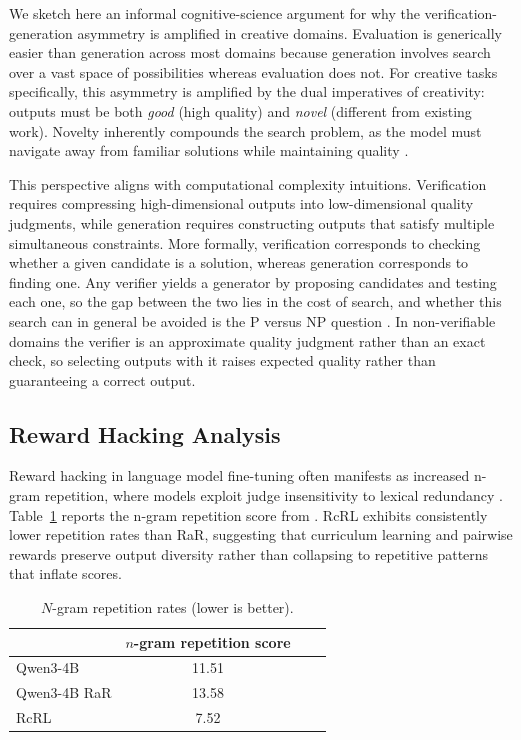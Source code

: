 \documentclass{article}
\theoremstyle{plain}
\theoremstyle{definition}
\theoremstyle{remark}
\begin{document}
We sketch here an informal cognitive-science argument for why the verification-generation asymmetry is amplified in creative domains. Evaluation is generically easier than generation across most domains because generation involves search over a vast space of possibilities whereas evaluation does not. For creative tasks specifically, this asymmetry is amplified by the dual imperatives of creativity: outputs must be both \emph{good} (high quality) and \emph{novel} (different from existing work). Novelty inherently compounds the search problem, as the model must navigate away from familiar solutions while maintaining quality \citep{newell1962processes, anderson1972recognition}.

This perspective aligns with computational complexity intuitions. Verification requires compressing high-dimensional outputs into low-dimensional quality judgments, while generation requires constructing outputs that satisfy multiple simultaneous constraints. More formally, verification corresponds to checking whether a given candidate is a solution, whereas generation corresponds to finding one. Any verifier yields a generator by proposing candidates and testing each one, so the gap between the two lies in the cost of search, and whether this search can in general be avoided is the P versus NP question \citep{cook2023complexity}. In non-verifiable domains the verifier is an approximate quality judgment rather than an exact check, so selecting outputs with it raises expected quality rather than guaranteeing a correct output. 



\subsection{Reward Hacking Analysis}
\label{app:repetition}
\label{app:failure-analysis}
Reward hacking in language model fine-tuning often manifests as increased n-gram repetition, where models exploit judge insensitivity to lexical redundancy \citep{holtzman2020curious}. Table~\ref{tab:repetition} reports the n-gram repetition score from \cite{paech2025slopScore}. RcRL exhibits consistently lower repetition rates than RaR, suggesting that curriculum learning and pairwise rewards preserve output diversity rather than collapsing to repetitive patterns that inflate scores.

\begin{table}[h]
\centering
\small
\caption{$N$-gram repetition rates (lower is better).}
\begin{tabular}{lccc}
\toprule
& $n$-gram repetition score \\
\midrule
Qwen3-4B & 11.51 \\
Qwen3-4B RaR & 13.58  \\
RcRL & 7.52 \\
\bottomrule
\end{tabular}

\label{tab:repetition}
\end{table}
\end{document}
